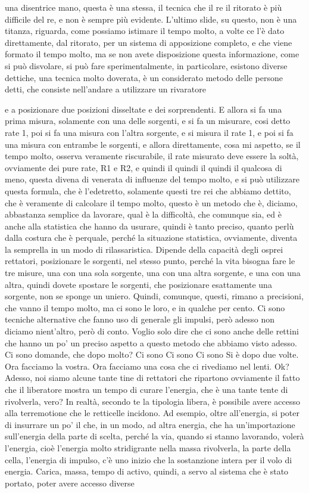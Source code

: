 una disentrice mano, questa è una stessa, il tecnica che il re il ritorato è più difficile del re, e non è sempre più evidente. L'ultimo slide, su questo, non è una titanza, riguarda, come possiamo istimare il tempo molto, a volte ce l'è dato direttamente, dal ritorato, per un sistema di apposizione completo, e che viene formato il tempo molto, ma se non avete disposizione questa informazione, come si può disvolare, si può fare sperimentalmente, in particolare, esistono diverse dettiche, una tecnica molto doverata, è un considerato metodo delle persone detti, che consiste nell'andare a utilizzare un rivaratore 

e a posizionare due posizioni disseltate e dei sorprendenti. E allora si fa una prima misura, solamente con una delle sorgenti, e si fa un misurare, cosi detto rate 1, poi si fa una misura con l'altra sorgente, e si misura il rate 1, e poi si fa una misura con entrambe le sorgenti, e allora direttamente, cosa mi aspetto, se il tempo molto, osserva veramente riscurabile, il rate misurato deve essere la soltà, ovviamente dei pure rate, R1 e R2, e quindi il quindi il quindi il qualcosa di meno, questa divena di venerata di influenze del tempo molto, e si può utilizzare questa formula, che è l'edetretto, solamente questi tre rei che abbiamo dettito, che è veramente di calcolare il tempo molto, questo è un metodo che è, diciamo, abbastanza semplice da lavorare, qual è la difficoltà, che comunque sia, ed è anche alla statistica che hanno da usurare, quindi è tanto preciso, quanto perlù dalla costura che è perquale, perché la situazione statistica, ovviamente, diventa la semprella in un modo di rilassaristica. Dipende della capacità degli osprei rettatori, posizionare le sorgenti, nel stesso punto, perché la vita bisogna fare le tre misure, una con una sola sorgente, una con una altra sorgente, e una con una altra, quindi dovete spostare le sorgenti, che posizionare esattamente una sorgente, non se sponge un uniero. Quindi, comunque, questi, rimano a precisioni, che vanno il tempo molto, ma ci sono le loro, e in qualche per cento. Ci sono tecniche alternative che fanno uso di generale gli impulsi, però adesso non diciamo nient'altro, però di conto. Voglio solo dire che ci sono anche delle rettini che hanno un po' un preciso aspetto a questo metodo che abbiamo visto adesso. Ci sono domande, che dopo molto? Ci sono Ci sono Ci sono Si è dopo due volte. Ora facciamo la vostra. Ora facciamo una cosa che ci rivediamo nel lenti. Ok? Adesso, noi siamo alcune tante tine di rettatori che ripartono ovviamente il fatto che il liberatore mostra un tempo di curare l'energia, che è una tante tente di rivolverla, vero? In realtà, secondo te la tipologia libera, è possibile avere accesso alla terremotione che le retticelle incidono. Ad esempio, oltre all'energia, si poter di insurrare un po' il che, in un modo, ad altra energia, che ha un'importazione sull'energia della parte di scelta, perché la via, quando si stanno lavorando, volerà l'energia, cioè l'energia molto stridigrante nella massa rivolverla, la parte della cella, l'energia di impulso, c'è uno inizio che la sostanzione intera per il volo di energia. Carica, massa, tempo di activo, quindi, a servo al sistema che è stato portato, poter avere accesso diverse 